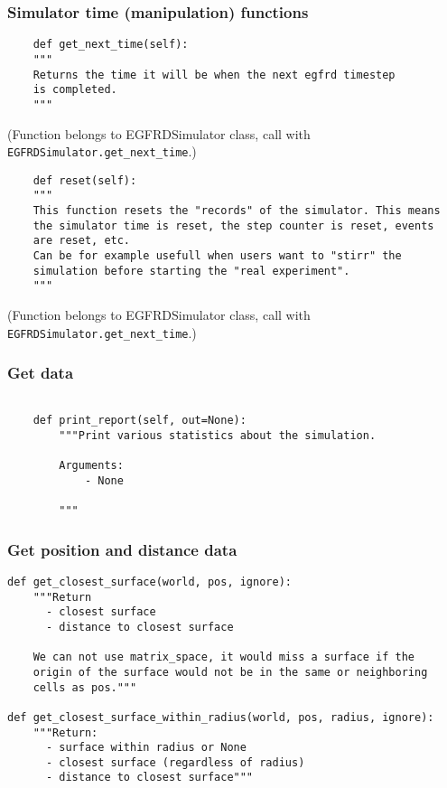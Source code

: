 \documentclass[a4paper,10pt]{article}
\begin{document}
\subsubsection{Simulator time (manipulation) functions}

\begin{verbatim}
    def get_next_time(self):
    """ 
    Returns the time it will be when the next egfrd timestep
    is completed.
    """ 
\end{verbatim}
(Function belongs to EGFRDSimulator class, call with \texttt{EGFRDSimulator.get\_next\_time}.)


\begin{verbatim}
    def reset(self):
    """
    This function resets the "records" of the simulator. This means
    the simulator time is reset, the step counter is reset, events
    are reset, etc.
    Can be for example usefull when users want to "stirr" the 
    simulation before starting the "real experiment".
    """
\end{verbatim}
(Function belongs to EGFRDSimulator class, call with \texttt{EGFRDSimulator.get\_next\_time}.)

\subsubsection{Get data}

\begin{verbatim}

    def print_report(self, out=None):
        """Print various statistics about the simulation.
        
        Arguments:
            - None

        """

\end{verbatim}

\subsubsection{Get position and distance data}
\begin{verbatim}
def get_closest_surface(world, pos, ignore):
    """Return
      - closest surface
      - distance to closest surface
    
    We can not use matrix_space, it would miss a surface if the 
    origin of the surface would not be in the same or neighboring 
    cells as pos."""

def get_closest_surface_within_radius(world, pos, radius, ignore):
    """Return:
      - surface within radius or None
      - closest surface (regardless of radius)
      - distance to closest surface"""


\end{verbatim}
\end{document}

